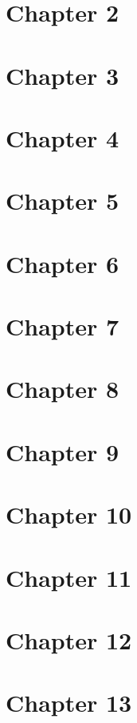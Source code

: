 \documentclass[10pt]{article}
\begin{document}
\section{Chapter 2}\newpage
\section{Chapter 3}\newpage
\section{Chapter 4}\newpage
\section{Chapter 5}\newpage
\section{Chapter 6}\newpage
\section{Chapter 7}\newpage
\section{Chapter 8}\newpage
\section{Chapter 9}\newpage
\section{Chapter 10}\newpage
\section{Chapter 11}\newpage
\section{Chapter 12}\newpage
\section{Chapter 13}\newpage
\end{document}
